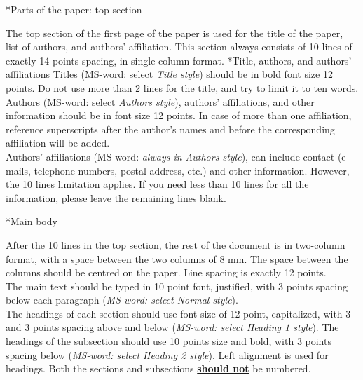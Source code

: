 \documentclass[twocolumn, a4paper,10pt]{article}
\makeatletter
\renewcommand\section{\@startsection{section}{1}{\z@}{3pt}{3pt}{\normalfont\large\bfseries}}
\renewcommand\subsection{\@startsection{subsection}{1}{\z@}{\z@}{\z@}{\normalfont\normalsize\bfseries}}
\renewcommand\subsection{\@startsection{subsection}{1}{\z@}{\z@}{0.1pt}{\normalfont\normalsize\bfseries}}
\makeatother
\begin{document}
\section*{Parts of the paper: top section}

The top section of the first page of the paper is used for the title of the paper, list of authors, and authors' affiliation. This section always consists of 10 lines of exactly 14 points spacing, in single column format.
\subsection*{Title, authors, and authors' affiliations}
Titles (MS-word: select \textit{Title style}) should be in bold font size 12 points. Do not use more than 2 lines for the title, and try to limit it to ten words.\\
Authors (MS-word: select \textit{Authors style}), authors' affiliations, and other information should be in font size 12 points. In case of more than one affiliation, reference superscripts after the author's names and before the corresponding affiliation will be added.\\
Authors' affiliations (MS-word: \textit{always in Authors style}), can include contact (e-mails, telephone numbers, postal address, etc.) and other information. However, the 10 lines limitation applies. If you need less than 10 lines for all the information, please leave the remaining lines blank.

\section*{Main body}

After the 10 lines in the top section, the rest of the document is in two-column format, with a space between the two columns of 8 mm. The space between the columns should be centred on the paper. Line spacing is exactly 12 points.\\
The main text should be typed in 10 point font, justified, with 3 points spacing below each paragraph (\textit{MS-word: select \textit{Normal style}}).\\
The headings of each section should use font size of 12 point, capitalized, with 3 and 3 points spacing above and below (\textit{MS-word: select \textit{Heading 1 style}}). The headings of the subsection should use 10 points size and bold, with 3 points spacing below (\textit{MS-word: select \textit{Heading 2 style}}). Left alignment is used for headings. Both the sections and subsections \underline{\textbf{should not}} be numbered.
\end{document}
